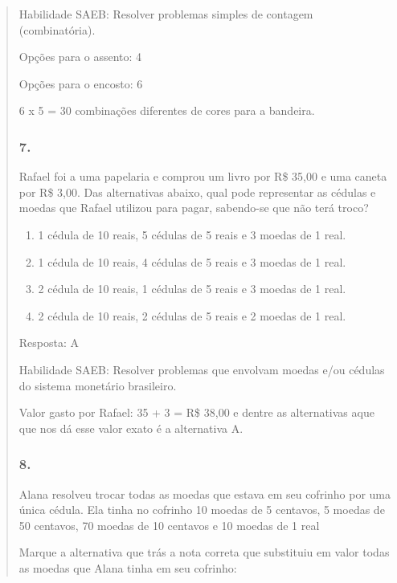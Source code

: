 \begin{enumerate}
\begin{escolha}
\begin{enumerate}
\begin{itemize}
\begin{itemize}
\begin{escolha}
\begin{quote}
\begin{escolha}
{Habilidade SAEB: Resolver problemas simples de contagem (combinatória).

Opções para o assento: 4

Opções para o encosto: 6

6 x 5 = 30 combinações diferentes de cores para a bandeira.

\subsubsection{7.}\label{section-193}

Rafael foi a uma papelaria e comprou um livro por R\$ 35,00 e uma caneta
por R\$ 3,00. Das alternativas abaixo, qual pode representar as cédulas
e moedas que Rafael utilizou para pagar, sabendo-se que não terá troco?

\begin{enumerate}
\def\labelenumi{\alph{enumi})}
\item
  1 cédula de 10 reais, 5 cédulas de 5 reais e 3 moedas de 1 real.
\item
  1 cédula de 10 reais, 4 cédulas de 5 reais e 3 moedas de 1 real.
\item
  2 cédula de 10 reais, 1 cédulas de 5 reais e 3 moedas de 1 real.
\item
  2 cédula de 10 reais, 2 cédulas de 5 reais e 2 moedas de 1 real.
\end{enumerate}

Resposta: A

Habilidade SAEB: Resolver problemas que envolvam moedas e/ou cédulas do
sistema monetário brasileiro.

Valor gasto por Rafael: 35 + 3 = R\$ 38,00 e dentre as alternativas aque
que nos dá esse valor exato é a alternativa A.

\subsubsection{8.}\label{section-194}

Alana resolveu trocar todas as moedas que estava em seu cofrinho por uma
única cédula. Ela tinha no cofrinho 10 moedas de 5 centavos, 5 moedas de
50 centavos, 70 moedas de 10 centavos e 10 moedas de 1 real

Marque a alternativa que trás a nota correta que substituiu em valor
todas as moedas que Alana tinha em seu cofrinho:

}
\end{escolha}
\end{quote}
\end{escolha}
\end{itemize}
\end{itemize}
\end{enumerate}
\end{escolha}
\end{enumerate}
